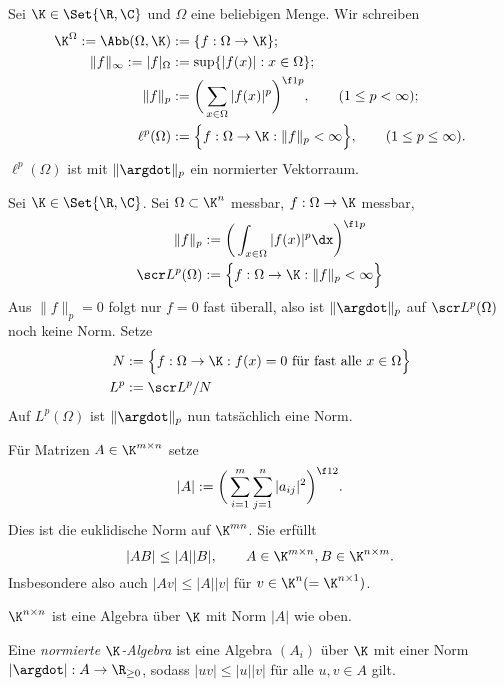 \begin{ex}
	Sei $\K \in \Set{\R, \C}$ und $\Omega$ eine beliebigen Menge.
	Wir schreiben
	\begin{align*}
		\K^\Omega := \Abb(\Omega, \K) &:= \{f : \Omega \to \K\}; \\
		\|f\|_{\infty} := |f|_\Omega &:= \sup \{ |f(x)| : x \in \Omega \}; \\
		\|f\|_{p} &:= \bigg( \sum_{x\in\Omega} |f(x)|^p \bigg)^{\f 1p},
			\qquad (1 \le p < \infty); \\
		\ell^p(\Omega) &:= \Big\{ f : \Omega \to \K : \|f\|_p < \infty \Big\},
			\qquad (1 \le p \le \infty).
	\end{align*}
	$\ell^p(\Omega)$ ist mit $\|\argdot\|_p$ ein normierter Vektorraum.
\end{ex}

\begin{ex}
	Sei $\K \in \Set{\R, \C}$.
	Sei $\Omega \subset \K^n$ messbar, $f : \Omega \to \K$ messbar,
	\begin{align*}
		\|f\|_p &:= \bigg( \int_{x\in \Omega} |f(x)|^p \dx \bigg)^{\f 1p} \\
		\scr L^p(\Omega) &:= \Big\{ f: \Omega \to \K : \|f\|_p < \infty \Big\}
	\end{align*}
	Aus $\|f\|_p = 0$ folgt nur $f=0$ fast überall, also ist $\|\argdot\|_p$ auf $\scr L^p(\Omega)$ noch keine Norm.
	Setze
	\begin{align*}
		N &:= \Big\{ f : \Omega \to \K : f(x) = 0 \text{ für fast alle $x\in\Omega$} \Big\}\\
		L^p &:= \scr L^p / N
	\end{align*}
	Auf $L^p(\Omega)$ ist $\|\argdot\|_p$ nun tatsächlich eine Norm.
\end{ex}

\begin{ex}
	Für Matrizen $A \in \K^{m\times n}$ setze
	\[
		|A| := \bigg( \sum_{i=1}^m \sum_{j=1}^n |a_{ij}|^2 \bigg)^{\f 12}.
	\]
	Dies ist die euklidische Norm auf $\K^{mn}$.
	Sie erfüllt
	\[
		|A B | \le |A| |B|,
		\qquad A \in \K^{m\times n}, B \in \K^{n\times m}.
	\]
	Insbesondere also auch $|Av| \le |A| |v|$ für $v\in \K^n (= \K^{n\times 1})$.
\end{ex}

\begin{ex}
	$\K^{n\times n}$ ist eine Algebra über $\K$ mit Norm $|A|$ wie oben.
\end{ex}

\begin{df}
	Eine \emph{normierte $\K$-Algebra} ist eine Algebra $(A_i)$ über $\K$ mit einer Norm $|\argdot|: A \to \R_{\ge 0}$, sodass $|uv| \le |u||v|$ für alle $u,v \in A$ gilt.
\end{df}

